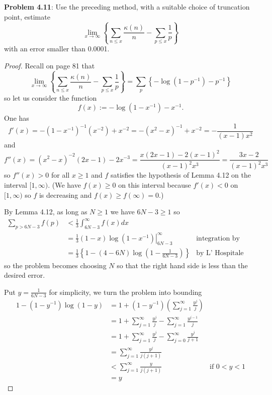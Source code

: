 \documentclass[12pt]{article}
\begin{document}
\fi

\textbf{Problem 4.11}: Use the preceding method, with a suitable choice of truncation point, estimate
$$\lim_{x \rightarrow \infty} \left\{\sum_{n \leq x} \frac{\kappa(n)}{n} - \sum_{p \leq x} \frac{1}{p} \right\}$$
with an error smaller than 0.0001.

\begin{proof}
Recall on page 81 that
$$\lim_{x \rightarrow \infty} \left\{\sum_{n \leq x} \frac{\kappa(n)}{n} - \sum_{p \leq x} \frac{1}{p} \right\} = \sum_p \left\{ - \log (1-p^{-1}) - p^{-1} \right\}$$
so let us consider the function
$$f(x) := -\log (1-x^{-1}) - x^{-1}.$$
One has
$$f'(x) = - (1-x^{-1})^{-1} (x^{-2}) + x^{-2} = -(x^2 - x)^{-1} + x^{-2} = -\frac{1}{(x-1)x^2}$$
and
$$f''(x) = (x^2 - x)^{-2} (2x - 1) - 2x^{-3} = \frac{x (2x-1) - 2(x-1)^2}{(x - 1)^2 x^3} = \frac{3 x - 2}{(x - 1)^2 x^3}$$
so $f''(x) > 0$ for all $x \geq 1$ and $f$ satisfies the hypothesis of Lemma 4.12 on the interval $[1, \infty)$. (We have $f(x) \geq 0$ on this interval because $f'(x) < 0$ on $[1, \infty)$ so $f$ is decreasing and $f(x) \geq f(\infty) = 0$.)

By Lemma 4.12, as long as $N \geq 1$ we have $6N - 3 \geq 1$ so
\begin{align*}
\sum_{p > 6N - 3} f(p) &< \frac{1}{3} \int_{6N - 3}^{\infty} f(x) dx \\
&= \left. \frac{1}{3} (1 - x) \log (1-x^{-1}) \right|_{6N-3}^{\infty} &\text{integration by parts} \\
&= \frac{1}{3}\left\{ 1 - (4 - 6N) \log \left(1-\frac{1}{6N-3}\right) \right\} &\text{by L' Hospitale rule}
\end{align*}
so the problem becomes choosing $N$ so that the right hand side is less than the desired error. 

Put $y = \frac{1}{6N-3}$ for simplicity, we turn the problem into bounding
\begin{align*}
1 - (1 - y^{-1}) \log(1 - y) &= 1 + (1 - y^{-1}) \left(\sum_{j = 1}^{\infty} \frac{y^j}{j} \right)\\
&= 1 + \sum_{j = 1}^{\infty} \frac{y^j}{j} - \sum_{j = 1}^{\infty} \frac{y^{j-1}}{j}\\
&= 1 + \sum_{j = 1}^{\infty} \frac{y^j}{j} - \sum_{j = 0}^{\infty} \frac{y^j}{j + 1}\\
&= \sum_{j = 1}^{\infty} \frac{y^j}{j (j + 1)}\\
&< \sum_{j = 1}^{\infty} \frac{y}{j (j + 1)} &\text{if } 0 < y < 1\\
&= y
\end{align*}


\end{proof}
\end{document}
